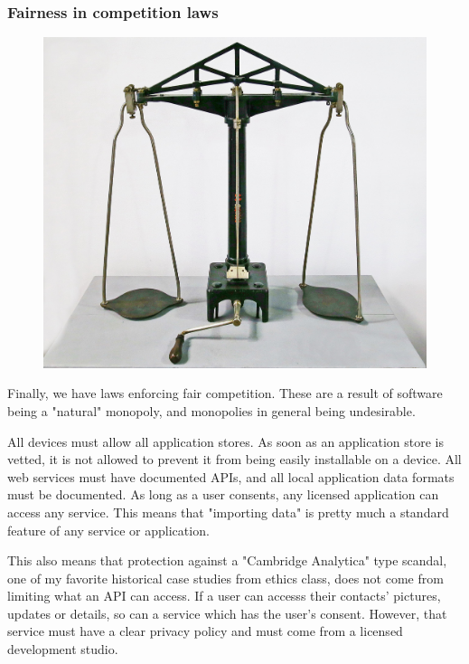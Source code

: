 \begin{frame}[fragile]
\frametitle{Fairness in competition laws}


\begin{figure}
\includegraphics[scale=0.1]{scale}
\end{figure}

\end{frame}

Finally,
we have laws enforcing fair competition.
These are a result of software being a
"natural"
monopoly,
and monopolies in general being undesirable.

All devices must allow all application stores.
As soon as an application store is vetted,
it is not allowed to prevent it from being easily installable on a device.
All web services must have documented APIs,
and all local application data formats must be documented.
As long as a user consents,
any licensed application can access any service.
This means that "importing data" is pretty much a standard feature
of any service or application.

This also means that protection against a
"Cambridge Analytica"
type scandal,
one of my favorite historical case studies from ethics class,
does not come from limiting what an API can access.
If a user can accesss their contacts' pictures,
updates
or details,
so can a service which has the user's consent.
However,
that service must have a clear privacy policy and must come from
a licensed development studio.

